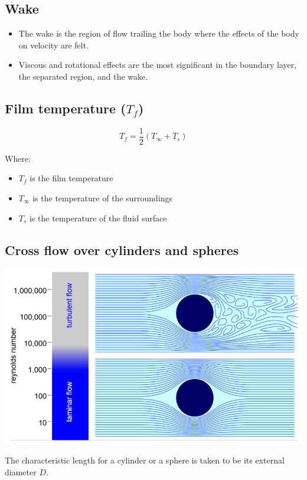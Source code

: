 \documentclass[11pt]{article}
\begin{document}
\subsection{Wake}
\label{sec:org7ef59ee}
\begin{itemize}
\item The wake is the region of flow trailing the body where the effects of the body on velocity are felt.
\item Viscous and rotational effects are the most significant in the boundary layer, the separated region, and the wake.
\end{itemize}

\subsection{Film temperature (\(T_f\))}
\label{sec:org23ef285}
\[T_f = \frac{1}{2} (T_{\infty} + T_s)\]

Where:
\begin{itemize}
\item \(T_f\) is the film temperature
\item \(T_{\infty}\) is the temperature of the surroundings
\item \(T_s\) is the temperature of the fluid surface
\end{itemize}

\subsection{Cross flow over cylinders and spheres}
\label{sec:org69fa005}
\begin{center}
\includegraphics[width=.9\linewidth]{./images/cross-flow-over-cylinders-and-spheres-diagram.png}
\end{center}
The characteristic length for a cylinder or a sphere is taken to be its external diameter \(D\).
\end{document}
